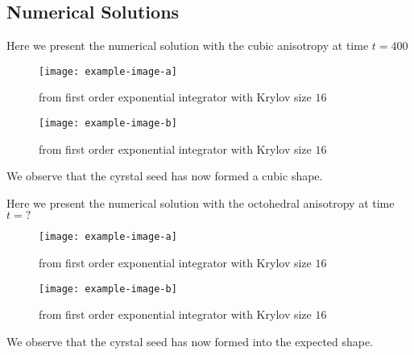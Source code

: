 \subsection{Numerical Solutions}
Here we present the numerical solution with the cubic anisotropy at time $t=400$
\begin{figure}[H]
    \centering
    \begin{minipage}{0.49\textwidth}
        \texttt{[image: example-image-a]} %
        \caption{from first order exponential integrator with Krylov size $16$}
        \label{fig:first order 8 0.5}
    \end{minipage}\hfill
    \centering
    \begin{minipage}{0.49\textwidth}
        \texttt{[image: example-image-b]} %
        \caption{from first order exponential integrator with Krylov size $16$}
        \label{fig:first order 10 0.5}
    \end{minipage}\hfill
\end{figure}
We observe that the cyrstal seed has now formed a cubic shape.


Here we present the numerical solution with the octohedral anisotropy at time $t=?$
\begin{figure}[H]
    \centering
    \begin{minipage}{0.49\textwidth}
        \texttt{[image: example-image-a]} %
        \caption{from first order exponential integrator with Krylov size $16$}
        \label{fig:first order 8 0.5}
    \end{minipage}\hfill
    \centering
    \begin{minipage}{0.49\textwidth}
        \texttt{[image: example-image-b]} %
        \caption{from first order exponential integrator with Krylov size $16$}
        \label{fig:first order 10 0.5}
    \end{minipage}\hfill
\end{figure}
We observe that the cyrstal seed has now formed into the expected shape.
